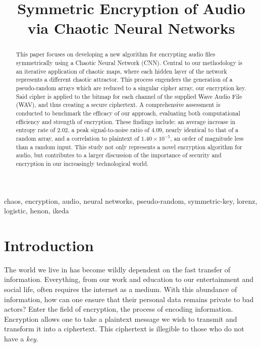 \documentclass[conference]{IEEEtran}
\begin{document}
\title{Symmetric Encryption of Audio \\ via Chaotic Neural Networks}

\author{
}

\maketitle

\begin{abstract}
This paper focuses on developing a new algorithm for encrypting audio files symmetrically using a Chaotic Neural Network (CNN).
Central to our methodology is an iterative application of chaotic maps, where each hidden layer of the network represents a different chaotic attractor.
This process engenders the generation of a pseudo-random arrays which are reduced to a singular cipher array, our encryption key.
Said cipher is applied to the bitmap for each channel of the supplied Wave Audio File (WAV), and thus creating a secure ciphertext.
A comprehensive assessment is conducted to benchmark the efficacy of our approach, evaluating both computational efficiency and strength of encryption.
These findings include: an average increase in entropy rate of $2.02$, a peak signal-to-noise ratio of $4.09$, nearly identical to that of a random array, and a correlation to plaintext of $1.40\times10^{-5}$, an order of magnitude less than a random input.
This study not only represents a novel encryption algorithm for audio, but contributes to a larger discussion of the importance of security and encryption in our increasingly technological world.
\end{abstract}

\begin{IEEEkeywords}
chaos, encryption, audio, neural networks, pseudo-random, symmetric-key, lorenz, logistic, henon, ikeda
\end{IEEEkeywords}

\section{Introduction}\label{sec:introduction}
The world we live in has become wildly dependent on the fast transfer of information.
Everything, from our work and education to our entertainment and social life, often requires the internet as a medium.
With this abundance of information, how can one ensure that their personal data remains private to bad actors?
Enter the field of encryption, the process of encoding information.
Encryption allows one to take a plaintext message we wish to transmit and transform it into a ciphertext.
This ciphertext is illegible to those who do not have a \textit{key}.
\end{document}

